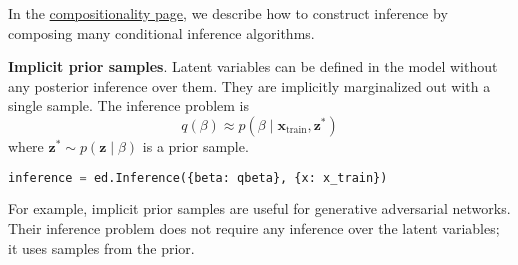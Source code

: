 In the \href{/api/inference-compositionality}{compositionality page},
we describe how to construct inference by composing
many conditional inference algorithms.

\textbf{Implicit prior samples}.
Latent variables can be defined in the model without any posterior
inference over them. They are implicitly marginalized out with a
single sample. The inference problem is
\begin{equation*}
q(\beta)\approx
p(\beta\mid\mathbf{x}_{\text{train}}, \mathbf{z}^*)
\end{equation*}
where $\mathbf{z}^*\sim p(\mathbf{z}\mid\beta)$ is a prior sample.

\begin{lstlisting}[language=Python]
inference = ed.Inference({beta: qbeta}, {x: x_train})
\end{lstlisting}

For example, implicit prior samples are useful for generative adversarial
networks. Their inference problem does not require any inference over
the latent variables; it uses samples from the prior.
